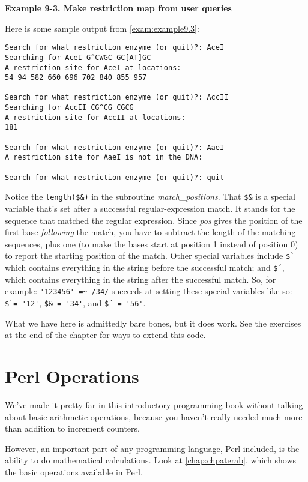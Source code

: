 \textbf{Example 9-3. Make restriction map from user queries}


Here is some sample output from \autoref{exam:example9.3}:

\begin{lstlisting}
Search for what restriction enzyme (or quit)?: AceI
Searching for AceI G^CWGC GC[AT]GC
A restriction site for AceI at locations:
54 94 582 660 696 702 840 855 957

Search for what restriction enzyme (or quit)?: AccII
Searching for AccII CG^CG CGCG
A restriction site for AccII at locations:
181

Search for what restriction enzyme (or quit)?: AaeI
A restriction site for AaeI is not in the DNA:

Search for what restriction enzyme (or quit)?: quit
\end{lstlisting}

Notice the \verb|length($&)| in the subroutine \textit{match\_positions}. That \verb|$&| is a special variable that's set after a successful regular-expression match.  It stands for the sequence that matched the regular expression. Since \textit{pos} gives the position of the first base \textit{following} the match, you have to subtract the length of the matching sequences, plus one (to make the bases start at position 1 instead of position 0) to report the starting position of the match. Other special variables include \verb|$`| which contains everything in the string before the successful match; and \verb|$´|, which contains everything in the string after the successful match. So, for example: \verb|'123456' =~ /34/| succeeds at setting these special variables like so: \verb|$`= '12'|, \verb|$& = '34'|, and \verb|$´ = '56'|.

What we have here is admittedly bare bones, but it does work. See the exercises at the end of the chapter for ways to extend this code. 

\section{Perl Operations}
We've made it pretty far in this introductory programming book without talking about basic arithmetic operations, because you haven't really needed much more than addition to increment counters.

However, an important part of any programming language, Perl included, is the ability to do mathematical calculations. Look at \autoref{chap:chpaterab}, which shows the basic operations available in Perl. 

